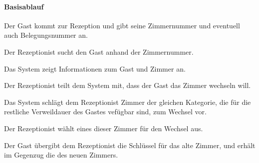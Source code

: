 \paragraph{Basisablauf}
\begin{longenum}
	\item Der \Gls{Gast} kommt zur \Gls{Rezeption} und gibt seine \Gls{Zimmernummer} und eventuell auch \Gls{Belegungsnummer} an.
	\item Der \Gls{Rezeptionist} sucht den Gast anhand der \Gls{Zimmernummer}.
	\item Das System zeigt Informationen zum \Gls{Gast} und \Gls{Zimmer} an.
	\item Der \Gls{Rezeptionist} teilt dem System mit, dass der \Gls{Gast} das \Gls{Zimmer} wechseln will.
	\item Das System schlägt dem \Gls{Rezeptionist} \Gls{Zimmer} der gleichen Kategorie, die für die restliche Verweildauer des \Gls{Gast}es vefügbar sind, zum Wechsel vor.
	\item Der \Gls{Rezeptionist} wählt eines dieser \Gls{Zimmer} für den Wechsel aus.
	\item Der \Gls{Gast} übergibt dem \Gls{Rezeptionist} die Schlüssel für das alte
	\Gls{Zimmer}, und erhält im Gegenzug die des neuen \Gls{Zimmer}s.
\end{longenum}

